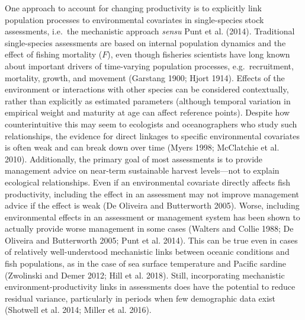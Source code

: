 \documentclass[]{article}
\begin{document}
One approach to account for changing productivity is to explicitly link
population processes to environmental covariates in single-species stock
assessments, i.e.~the mechanistic approach \emph{sensu} Punt et al.
(2014). Traditional single-species assessments are based on internal
population dynamics and the effect of fishing mortality (\(F\)), even
though fisheries scientists have long known about important drivers of
time-varying population processes, e.g.~recruitment, mortality, growth,
and movement (Garstang 1900; Hjort 1914). Effects of the environment or
interactions with other species can be considered contextually, rather
than explicitly as estimated parameters (although temporal variation in
empirical weight and maturity at age can affect reference points).
Despite how counterintuitive this may seem to ecologists and
oceanographers who study such relationships, the evidence for direct
linkages to specific environmental covariates is often weak and can
break down over time (Myers 1998; McClatchie et al. 2010). Additionally,
the primary goal of most assessments is to provide management advice on
near-term sustainable harvest levels---not to explain ecological
relationships. Even if an environmental covariate directly affects fish
productivity, including the effect in an assessment may not improve
management advice if the effect is weak (De Oliveira and Butterworth
2005). Worse, including environmental effects in an assessment or
management system has been shown to actually provide worse management in
some cases (Walters and Collie 1988; De Oliveira and Butterworth 2005;
Punt et al. 2014). This can be true even in cases of relatively
well-understood mechanistic links between oceanic conditions and fish
populations, as in the case of sea surface temperature and Pacific
sardine (Zwolinski and Demer 2012; Hill et al. 2018). Still,
incorporating mechanistic environment-productivity links in assessments
does have the potential to reduce residual variance, particularly in
periods when few demographic data exist (Shotwell et al. 2014; Miller et
al. 2016).
\end{document}
